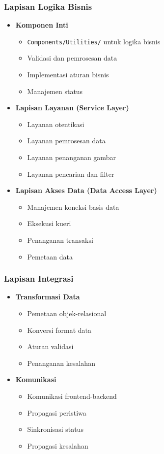 \documentclass[12pt,a4paper]{article}
\begin{document}
\subsubsection{Lapisan Logika Bisnis}
\begin{itemize}
    \item \textbf{Komponen Inti}
    \begin{itemize}
        \item \texttt{Components/Utilities/} untuk logika bisnis
        \item Validasi dan pemrosesan data
        \item Implementasi aturan bisnis
        \item Manajemen status
    \end{itemize}
    
    \item \textbf{Lapisan Layanan (Service Layer)}
    \begin{itemize}
        \item Layanan otentikasi
        \item Layanan pemrosesan data
        \item Layanan penanganan gambar
        \item Layanan pencarian dan filter
    \end{itemize}
    
    \item \textbf{Lapisan Akses Data (Data Access Layer)}
    \begin{itemize}
        \item Manajemen koneksi basis data
        \item Eksekusi kueri
        \item Penanganan transaksi
        \item Pemetaan data
    \end{itemize}
\end{itemize}

\subsubsection{Lapisan Integrasi}
\begin{itemize}
    \item \textbf{Transformasi Data}
    \begin{itemize}
        \item Pemetaan objek-relasional
        \item Konversi format data
        \item Aturan validasi
        \item Penanganan kesalahan
    \end{itemize}
    
    \item \textbf{Komunikasi}
    \begin{itemize}
        \item Komunikasi frontend-backend
        \item Propagasi peristiwa
        \item Sinkronisasi status
        \item Propagasi kesalahan
    \end{itemize}
\end{itemize}
\end{document}

